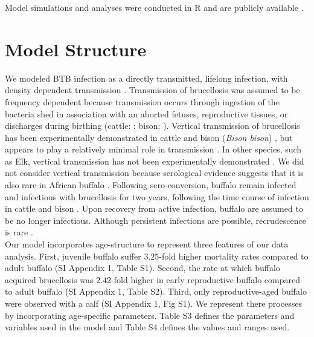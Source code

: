 \documentclass[10pt,letterpaper]{article}
\begin{document}
Model simulations and analyses were conducted in R and are publicly available \cite{gorsich_git}.

\pagebreak

\section* {Model Structure}
We modeled BTB infection as a directly transmitted, lifelong infection, with density dependent transmission \cite{jolles_interactions_2008}. 
Transmission of brucellosis was assumed to be frequency dependent because transmission occurs through ingestion of the bacteria shed in association with an aborted fetuses, reproductive tissues, or discharges during birthing (cattle: \cite{samartino_pathogenesis_1993}; bison: \cite{rhyan_pathogenesis_2009, rhyan_pathology_2001}). 
Vertical transmission of brucellosis has been experimentally demonstrated in cattle and bison (\textit{Bison bison}) \cite{plommet_brucellose_1973, fensterbank_congenital_1978}, but appears to play a relatively minimal role in transmission \cite{hobbs_state-space_2015}. 
In other species, such as Elk, vertical transmission has not been experimentally demonstrated \cite{thorne_brucellosis_1978}.
We did not consider vertical transmission because serological evidence suggests that it is also rare in African buffalo \cite{gorsich_context-dependent_2015}.
Following sero-conversion, buffalo remain infected and infectious with brucellosis for two years, following the time course of infection in cattle and bison \cite{rhyan_pathogenesis_2009, hobbs_state-space_2015, treanor_vaccination_2010}.  
Upon recovery from active infection, buffalo are assumed to be no longer infectious. 
Although persistent infections are possible, recrudescence is rare \cite{hobbs_state-space_2015}. \\

Our model incorporates age-structure to represent three features of our data analysis.  
First, juvenile buffalo suffer $3.25$-fold higher mortality rates compared to adult buffalo (SI Appendix 1, Table S1). 
Second, the rate at which buffalo acquired brucellosis was $2.42$-fold higher in early reproductive buffalo compared to adult buffalo (SI Appendix 1, Table S2). 
Third, only reproductive-aged buffalo were observed with a calf (SI Appendix 1, Fig S1).
We represent there processes by incorporating age-specific parameters. 
Table S3 defines the parameters and variables used in the model and Table S4 defines the values and ranges used.\\
\end{document}
